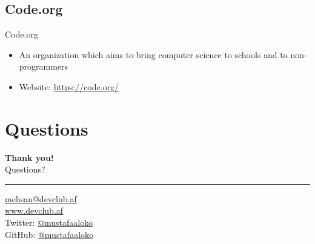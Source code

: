 \documentclass{beamer}
\newcommand{\wl}[2]{\href{#1}{\textcolor{UniBlue}{#2}}}
\begin{document}
\subsection{Code.org}
\begin{frame}{Code.org}
	\begin{itemize}
		\item An organization which aims to bring computer science to schools and to non-programmers
		\item Website: \wl{https://code.org/}{https://code.org/}
	\end{itemize}
\end{frame}































%






\section*{Questions}
\begin{frame}{}
\centering
\textcolor{UniBlue}{\Large \textbf{Thank you!}} \\
Questions?

{\color{UniBlue} \rule{\linewidth}{0.2mm} }
\wl{mailto:mehsan@devclub.af}{mehsan@devclub.af}\\
\wl{www.devclub.af}{www.devclub.af}\\
Twitter: \wl{https://twitter.com/mustafaaloko}{@mustafaaloko}\\
GitHub: \wl{https://github.com/mustafaaloko}{@mustafaaloko}\\
\end{frame}
\end{document}
